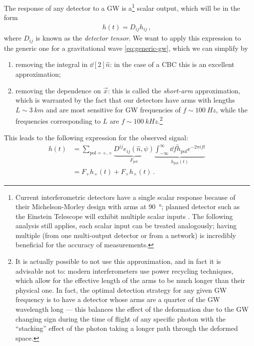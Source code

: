 \documentclass[main.tex]{subfiles}
\begin{document}
The response of any detector to a \ac{GW} is a\footnote{Current interferometric detectors have a single scalar response because of their Michelson-Morley design with arms at \SI{90}{\degree}; planned detector such as the Einstein Telescope will exhibit multiple scalar inputs \cite[section 5.3.2]{etscienceteamEinsteinGravitationalWave2011}. The following analysis still applies, each scalar input can be treated analogously; having multiple (from one multi-output detector or from a network) is incredibly beneficial for the accuracy of measurements.} scalar output, which will be in the form 
%
\begin{align}
h(t) = D_{ij} h_{ij}
\,,
\end{align}
%
where \(D_{ij}\) is known as the \emph{detector tensor}. 
We want to apply this expression to the generic one for a gravitational wave \eqref{eq:generic-gw}, which we can simplify by
\begin{enumerate}
    \item removing the integral in \(\dd[2]{\hat{n}}\): in the case of a \ac{CBC} this is an excellent approximation;
    \item removing the dependence on \(\vec{x}\): this is called the \emph{short-arm} approximation, which is warranted by the fact that our detectors have arms with lengths \(L \sim \SI{3}{km}\) and are most sensitive for \ac{GW} frequencies of \(f \sim \SI{100}{Hz}\), while the frequencies corresponding to \(L\) are \(f \sim
     \SI{100}{kHz}\).\footnote{It is actually possible to not use this approximation, and in fact it is advisable not to: modern interferometers use power recycling techniques, which allow for the effective length of the arms to be much longer than their physical one. In fact, the optimal detection strategy for any given \ac{GW} frequency is to have a detector whose arms are a quarter of the \ac{GW} wavelength long \cite[eq.\ 9.33]{maggioreGravitationalWavesVolume2007} --- this balances the effect of the deformation due to the \ac{GW} changing sign during the time of flight of any specific photon with the ``stacking'' effect of the photon taking a longer path through the deformed space.}
\end{enumerate}

This leads to the following expression for the observed signal:
%
\begin{align}
h(t) &= \sum _{\text{pol}= +, \times } \underbrace{D^{ij} e_{ij}(\hat{n}, \psi )}_{F _{\text{pol}}}  \underbrace{\int_{- \infty }^{\infty } \dd{f} \widetilde{h} _{\text{pol}} e^{-2 \pi i f t}}_{h _{\text{pol}}(t)}  \\
&= F_+ h_+ (t) + F_\times h_\times (t)
\,.
\end{align}
\end{document}
